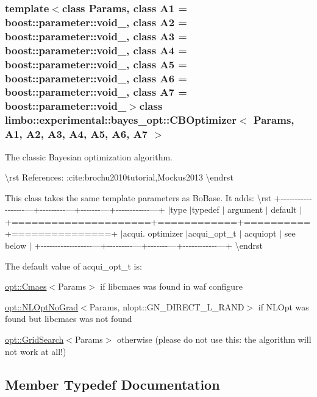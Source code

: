 \subsubsection*{template$<$class Params, class A1 = boost\+::parameter\+::void\+\_\+, class A2 = boost\+::parameter\+::void\+\_\+, class A3 = boost\+::parameter\+::void\+\_\+, class A4 = boost\+::parameter\+::void\+\_\+, class A5 = boost\+::parameter\+::void\+\_\+, class A6 = boost\+::parameter\+::void\+\_\+, class A7 = boost\+::parameter\+::void\+\_\+$>$class limbo\+::experimental\+::bayes\+\_\+opt\+::\+C\+B\+Optimizer$<$ Params, A1, A2, A3, A4, A5, A6, A7 $>$}

The classic Bayesian optimization algorithm.

\textbackslash{}rst References\+: \+:cite\+:{\ttfamily brochu2010tutorial,Mockus2013} \textbackslash{}endrst

This class takes the same template parameters as Bo\+Base. It adds\+: \textbackslash{}rst +-\/-\/-\/-\/-\/-\/-\/-\/-\/-\/-\/-\/-\/-\/-\/-\/-\/-\/---+-\/-\/-\/-\/-\/-\/-\/-\/-\/---+-\/-\/-\/-\/-\/-\/-\/---+-\/-\/-\/-\/-\/-\/-\/-\/-\/-\/-\/-\/---+ $\vert$type $\vert$typedef $\vert$ argument $\vert$ default $\vert$ +=====================+============+==========+===============+ $\vert$acqui. optimizer $\vert$acqui\+\_\+opt\+\_\+t $\vert$ acquiopt $\vert$ see below $\vert$ +-\/-\/-\/-\/-\/-\/-\/-\/-\/-\/-\/-\/-\/-\/-\/-\/-\/-\/---+-\/-\/-\/-\/-\/-\/-\/-\/-\/---+-\/-\/-\/-\/-\/-\/-\/---+-\/-\/-\/-\/-\/-\/-\/-\/-\/-\/-\/-\/---+ \textbackslash{}endrst

The default value of acqui\+\_\+opt\+\_\+t is\+:
\begin{DoxyItemize}
\item {\ttfamily \hyperlink{structlimbo_1_1opt_1_1_cmaes}{opt\+::\+Cmaes}$<$Params$>$} if libcmaes was found in {\ttfamily waf configure}
\item {\ttfamily \hyperlink{structlimbo_1_1opt_1_1_n_l_opt_no_grad}{opt\+::\+N\+L\+Opt\+No\+Grad}$<$Params, nlopt\+::\+G\+N\+\_\+\+D\+I\+R\+E\+C\+T\+\_\+\+L\+\_\+\+R\+A\+N\+D$>$} if N\+L\+Opt was found but libcmaes was not found
\item {\ttfamily \hyperlink{structlimbo_1_1opt_1_1_grid_search}{opt\+::\+Grid\+Search}$<$Params$>$} otherwise (please do not use this\+: the algorithm will not work at all!) 
\end{DoxyItemize}

\subsection{Member Typedef Documentation}
\hypertarget{classlimbo_1_1experimental_1_1bayes__opt_1_1_c_b_optimizer_aa3b86d243d0d118a1c2f39bb00663c80}{}
